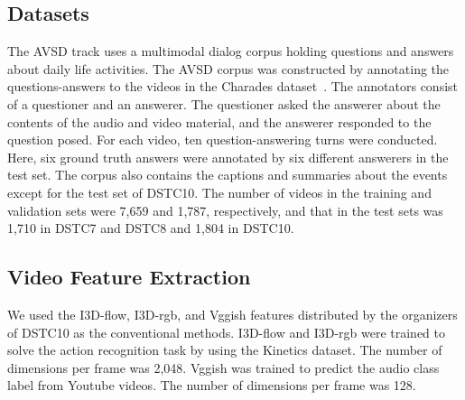 \documentclass[letterpaper]{article} %
\begin{document}
\subsection{Datasets}
The AVSD track uses a multimodal dialog corpus holding questions and answers about daily life activities.
The AVSD corpus was constructed by annotating the questions-answers to the videos in the Charades dataset~\cite{Sigurdsson2016hollywood}.
The annotators consist of a questioner and an answerer.
The questioner asked the answerer about the contents of the audio and video material, and the answerer responded to the question posed.
%
For each video, ten question-answering turns were conducted.
Here, six ground truth answers were annotated by six different answerers in the test set.
The corpus also contains the captions and summaries about the events except for the test set of DSTC10.
%
The number of videos in the training and validation sets were 7,659 and 1,787, respectively, and that in the test sets was 1,710 in DSTC7 and DSTC8 and 1,804 in DSTC10.


\subsection{Video Feature Extraction}
We used the I3D-flow, I3D-rgb, and Vggish features distributed by the organizers of DSTC10 as the conventional methods.
I3D-flow and I3D-rgb were trained to solve the action recognition task by using the Kinetics dataset.
The number of dimensions per frame was 2,048.
Vggish was trained to predict the audio class label from Youtube videos.
The number of dimensions per frame was 128.
\end{document}
